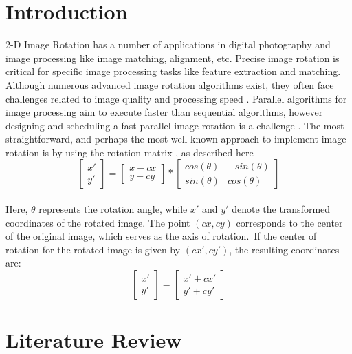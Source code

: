 \documentclass[conference]{IEEEtran}
\begin{document}
\section{Introduction}
2-D Image Rotation has a number of applications in digital photography and image processing like image matching, alignment, \cite{gaster2012heterogeneous} etc. Precise image rotation is critical for specific image processing tasks like feature extraction and matching. Although numerous advanced image rotation algorithms exist, they often face challenges related to image quality and processing speed \cite{ashtari2015double} \cite{park2009accurate}.
Parallel algorithms for image processing aim to execute faster than sequential algorithms, however designing and scheduling a fast parallel image rotation is a challenge \cite{kwon2016study}.
The most straightforward, and perhaps the most well known approach to implement image rotation is by using the rotation matrix \cite{evans2001rotations}, as described here
$$\begin{bmatrix}
        x' \\
        y'
    \end{bmatrix} = \begin{bmatrix}
        x - cx \\
        y - cy
    \end{bmatrix} * \begin{bmatrix}
        cos(\theta) & -sin(\theta) \\
        sin(\theta) & cos(\theta)
    \end{bmatrix}$$\\
    Here, $\theta$ represents the rotation angle, while $x'$ and $y'$ denote the transformed coordinates of the rotated image. The point $(cx, cy)$ corresponds to the center of the original image, which serves as the axis of rotation.\ If the center of rotation for the rotated image is given by $(cx', cy')$, the resulting coordinates are:
$$\begin{bmatrix}
        x' \\
        y'
    \end{bmatrix} = \begin{bmatrix}
        x' + cx' \\
        y' + cy'
    \end{bmatrix}$$



\section{Literature Review}
\end{document}
